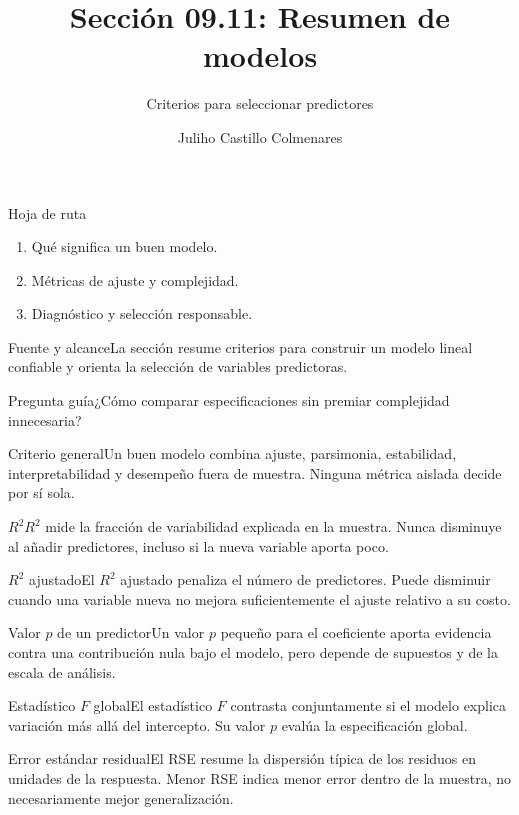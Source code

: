 \documentclass[10pt,aspectratio=169]{beamer}
\title[Resumen de modelos]{Sección 09.11: Resumen de modelos}\subtitle{Criterios para seleccionar predictores}\author[J. Castillo Colmenares]{Juliho Castillo Colmenares}\institute{Tecnológico de Monterrey}\date{}
\begin{document}
\begin{frame}[plain]\titlepage\end{frame}
\begin{frame}{Hoja de ruta}\small\begin{enumerate}\item Qué significa un buen modelo.\item Métricas de ajuste y complejidad.\item Diagnóstico y selección responsable.\end{enumerate}\end{frame}
\begin{frame}{Fuente y alcance}\small La sección resume criterios para construir un modelo lineal confiable y orienta la selección de variables predictoras.\begin{block}{Pregunta guía}¿Cómo comparar especificaciones sin premiar complejidad innecesaria?\end{block}\end{frame}
\begin{frame}{Criterio general}\small Un buen modelo combina ajuste, parsimonia, estabilidad, interpretabilidad y desempeño fuera de muestra. Ninguna métrica aislada decide por sí sola.\end{frame}
\begin{frame}{$R^2$}\small $R^2$ mide la fracción de variabilidad explicada en la muestra. Nunca disminuye al añadir predictores, incluso si la nueva variable aporta poco.\end{frame}
\begin{frame}{$R^2$ ajustado}\small El $R^2$ ajustado penaliza el número de predictores. Puede disminuir cuando una variable nueva no mejora suficientemente el ajuste relativo a su costo.\end{frame}
\begin{frame}{Valor $p$ de un predictor}\small Un valor $p$ pequeño para el coeficiente aporta evidencia contra una contribución nula bajo el modelo, pero depende de supuestos y de la escala de análisis.\end{frame}
\begin{frame}{Estadístico $F$ global}\small El estadístico $F$ contrasta conjuntamente si el modelo explica variación más allá del intercepto. Su valor $p$ evalúa la especificación global.\end{frame}
\begin{frame}{Error estándar residual}\small El RSE resume la dispersión típica de los residuos en unidades de la respuesta. Menor RSE indica menor error dentro de la muestra, no necesariamente mejor generalización.\end{frame}
\end{document}
